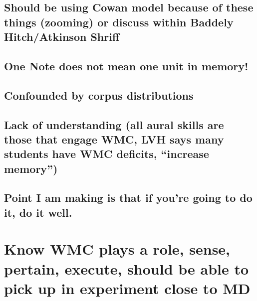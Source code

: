 \documentclass[]{book}
\theoremstyle{definition}
\theoremstyle{definition}
\theoremstyle{definition}
\theoremstyle{remark}
\begin{document}
\hypertarget{should-be-using-cowan-model-because-of-these-things-zooming-or-discuss-within-baddely-hitchatkinson-shriff}{%
\subsection{Should be using Cowan model because of these things
(zooming) or discuss within Baddely Hitch/Atkinson
Shriff}\label{should-be-using-cowan-model-because-of-these-things-zooming-or-discuss-within-baddely-hitchatkinson-shriff}}

\hypertarget{one-note-does-not-mean-one-unit-in-memory}{%
\subsection{One Note does not mean one unit in
memory!}\label{one-note-does-not-mean-one-unit-in-memory}}

\hypertarget{confounded-by-corpus-distributions}{%
\subsection{Confounded by corpus
distributions}\label{confounded-by-corpus-distributions}}

\hypertarget{lack-of-understanding-all-aural-skills-are-those-that-engage-wmc-lvh-says-many-students-have-wmc-deficits-increase-memory}{%
\subsection{Lack of understanding (all aural skills are those that
engage WMC, LVH says many students have WMC deficits, ``increase
memory'')}\label{lack-of-understanding-all-aural-skills-are-those-that-engage-wmc-lvh-says-many-students-have-wmc-deficits-increase-memory}}

\hypertarget{point-i-am-making-is-that-if-youre-going-to-do-it-do-it-well.}{%
\subsection{Point I am making is that if you're going to do it, do it
well.}\label{point-i-am-making-is-that-if-youre-going-to-do-it-do-it-well.}}

\hypertarget{know-wmc-plays-a-role-sense-pertain-execute-should-be-able-to-pick-up-in-experiment-close-to-md}{%
\section{Know WMC plays a role, sense, pertain, execute, should be able
to pick up in experiment close to
MD}\label{know-wmc-plays-a-role-sense-pertain-execute-should-be-able-to-pick-up-in-experiment-close-to-md}}
\end{document}

